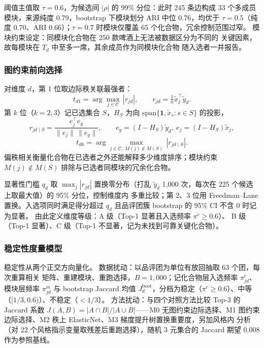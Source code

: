 \documentclass[12pt,a4paper]{article}
\begin{document}
阈值主值取 $\tau=0.6$，为候选间 $|\rho|$ 的 99\% 分位：此时 245
条边构成 33 个多成员模块，来源纯度 0.79，bootstrap 下模块划分 ARI
中位 0.76，均优于 $\tau=0.5$（纯度 0.70、ARI 0.66）；$\tau=0.7$
时模块仅覆盖 65 个化合物，冗余控制范围过窄。
模块约束设定：同模块化合物在 250 款啤酒上无法被数据区分为不同的
关键因素，故每模块在 $T_d$ 中至多一席，其余成员作为同模块化合物
随入选者一并报告。

\subsubsection{图约束前向选择}

对维度 $d$，第 1 位取边际秩关联最强者：
\begin{equation}
  t_{d1}=\arg\max_{j\in\mathcal C}\,|r_{jd}|,\qquad
  r_{jd}=\tfrac1n\tilde x_j^\top\tilde y_d .
\end{equation}
第 $k$ 位（$k=2,3$）记已选集合 $S$，$H_S$ 为向
$\mathrm{span}\{\mathbf 1,\tilde x_s:s\in S\}$ 的投影，
\begin{equation}
  r_{jd\mid S}=\frac{e_j^\top e_y}{\|e_j\|\,\|e_y\|},\qquad
  e_y=(I-H_S)\tilde y_d,\ e_j=(I-H_S)\tilde x_j,
\end{equation}
\begin{equation}
  t_{dk}=\arg\max_{j\in\mathcal C,\;M(j)\notin M(S)}\,|r_{jd\mid S}| .
\end{equation}
偏秩相关衡量化合物在已选者之外还能解释多少维度排序；模块约束
$M(j)\notin M(S)$ 排除与已选者同模块的冗余化合物。

显著性门槛 $q_d$ 取 $\max_j|r_{jd}|$ 置换零分布（打乱 $\tilde y_d$
1{,}000 次，每次在 225 个候选上取最大值）的 95\% 分位，控制维度内
多重比较；第 2、3 位用 Freedman--Lane 置换。入选项同时满足得分超过
$q_d$ 且品评团簇 bootstrap 的 95\% CI 不含 0 时记为显著。
由此定义维度等级：A 级（Top-1 显著且入选频率 $\pi^c\ge0.6$）、
B 级（Top-1 显著）、C 级（Top-1 不显著，记为未找到可靠关键化合物）。

\subsubsection{稳定性度量模型}

稳定性从两个正交方向量化。
数据扰动：以品评团为单位有放回抽取 63 个团，每次重算相关
矩阵、重建模块、重跑选择，$B=1{,}000$；记化合物层入选频率
$\pi^c_{jd}$、模块层频率 $\pi^m_{jd}$ 与 bootstrap Jaccard 均值
$J^{\mathrm{boot}}_d$，分档为稳定（$\pi^c\ge0.6$）、中等
（$[1/3,0.6)$）、不稳定（$<1/3$）。
方法扰动：与四个对照方法比较 Top-3 的 Jaccard 系数
$J(A,B)=|A\cap B|/|A\cup B|$——M0 无图约束边际选择、M1 图约束
边际选择、M2 秩上 ElasticNet、M3 梯度提升树置换重要度，另加风格内
分析（对 22 个风格指示变量取残差后重跑选择），随机 3 元集合的
Jaccard 期望 0.008 作为参照基线。
\end{document}
